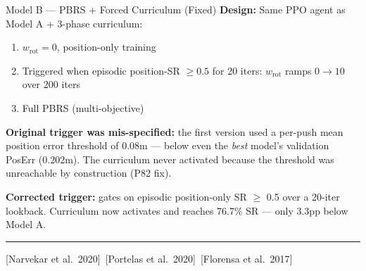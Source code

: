 \documentclass[aspectratio=169,xcolor=dvipsnames,t]{beamer}
\newcommand{\litfooter}[1]{%
  \vspace{2pt}%
  \hrule%
  \vspace{2pt}%
  {\tiny\color{LightDarkGrey} #1}%
}
\begin{document}
\begin{frame}[t]{Model B — PBRS + Forced Curriculum \hfill \textcolor{hlgreen}{(Fixed)}}
  \textbf{Design:} Same PPO agent as Model A + 3-phase curriculum:
  \begin{enumerate}
    \item $w_{\text{rot}}=0$, position-only training
    \item Triggered when episodic position-SR $\ge 0.5$ for 20 iters: $w_{\text{rot}}$ ramps $0\to10$ over 200 iters
    \item Full PBRS (multi-objective)
  \end{enumerate}

  \vspace{2pt}
  \textbf{\textcolor{hlred}{Original trigger was mis-specified:}} the first version used a per-push mean position error threshold of 0.08m — below even the \emph{best} model's validation PosErr (0.202m). The curriculum never activated because the threshold was unreachable by construction (P82 fix).

  \vspace{2pt}
  \textbf{Corrected trigger:} gates on episodic position-only SR $\ge$ 0.5 over a 20-iter lookback. Curriculum now activates and reaches \textcolor{hlgreen}{76.7\% SR} — only 3.3pp below Model A.

  \vfill\litfooter{[Narvekar et al.\ 2020]~[Portelas et al.\ 2020]~[Florensa et al.\ 2017]}
\end{frame}

\end{document}
